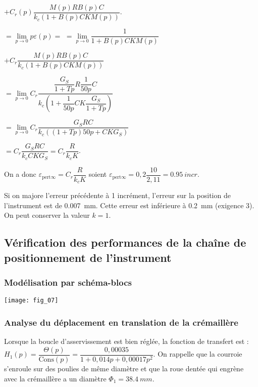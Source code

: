 \begin{multicols}{2}
\begin{corrige}
$+ C_r(p) \dfrac{M(p)R B(p)C}{k_c\left( 1+ B(p)C  K M(p) \right)}  $.

$=\lim\limits_{p\to 0} p \varepsilon (p) = $
$ =\lim\limits_{p\to 0}  \dfrac{1}{1+ B(p)C  K M(p)}  $

$+ C_r \dfrac{M(p)R B(p)C}{k_c\left( 1+ B(p)C  K M(p) \right)}  $

$ =\lim\limits_{p\to 0}  C_r \dfrac{\dfrac{G_S}{1+Tp}R \dfrac{1}{50p}C}{k_c\left( 1+ \dfrac{1}{50p}C  K \dfrac{G_S}{1+Tp} \right)}  $


$ = \lim\limits_{p\to 0}  C_r \dfrac{G_S R C}{k_c\left( \left(1+Tp \right)50p+ C  K G_S \right)}  $

$= C_r \dfrac{G_S R C}{k_c  C  K G_S }= C_r \dfrac{ R }{k_c   K }  $.

On a donc  $\varepsilon_{\text{pert} \infty} = C_r \dfrac{ R }{k_c   K }  $ soient $\varepsilon_{\text{pert} \infty} = 0,2 \dfrac{ 10}{2,1   1 } =\SI{0,95}{incr}$.


\end{corrige}
\else
\fi




\ifprof
\begin{corrige}
Si on majore l'erreur précédente à 1 incrément, l'erreur sur la position de l’instrument est de \SI{0,007}{mm}.
Cette erreur est inférieure à \SI{0,2}{mm} (exigence 3).  On peut conserver la valeur $k=1$.
\end{corrige}
\else
\fi



\subsection*{Vérification des performances de la chaîne de positionnement de l'instrument}
\subsubsection*{Modélisation par schéma-blocs}
\ifprof
\else
\begin{center}
\texttt{[image: fig\_07]}
\end{center}
\fi

\subsubsection*{Analyse du déplacement en translation de la crémaillère}
\ifprof
\else
Lorsque la boucle d’asservissement est bien réglée, la fonction de transfert est : $H_1(p)=\dfrac{\Theta(p)}{\text{Cons}(p)} = \dfrac{0,00035}{1+0,014p+0,00017 p^2}$. 
On rappelle que la courroie s’enroule sur des poulies de même diamètre et que la roue dentée qui engrène avec la crémaillère a un diamètre $\Phi_1 = \SI{38,4}{mm}$.
\fi


\end{multicols}
